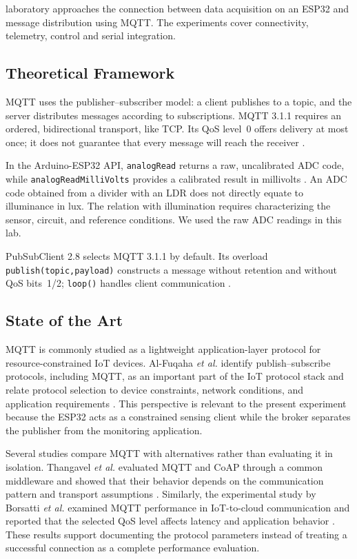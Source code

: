 laboratory approaches the connection between data acquisition on an ESP32 and message distribution using MQTT. The experiments cover connectivity, telemetry, control and serial integration.

\subsection{Theoretical Framework}
MQTT uses the publisher--subscriber model: a client publishes to a topic, and the server distributes messages according to subscriptions.
MQTT 3.1.1 requires an ordered, bidirectional transport, like TCP. Its QoS level~0 offers delivery at most once; it does not guarantee that every message will reach the receiver \cite{mqtt311}.

In the Arduino-ESP32 API, \texttt{analogRead} returns a raw, uncalibrated ADC code, while \texttt{analogReadMilliVolts} provides a calibrated result in millivolts \cite{esp32adc}. An ADC code obtained from a divider with an LDR does not directly equate to illuminance in lux. The relation
with illumination requires characterizing the sensor, circuit, and reference conditions. We used the raw ADC readings in this lab.

PubSubClient 2.8 selects MQTT 3.1.1 by default. Its overload \texttt{publish(topic,payload)} constructs a message without retention and without QoS bits~1/2; \texttt{loop()} handles client communication \cite{pubsub28}.

\subsection{State of the Art}
MQTT is commonly studied as a lightweight application-layer protocol for
resource-constrained IoT devices. Al-Fuqaha \emph{et al.} identify
publish--subscribe protocols, including MQTT, as an important part of the
IoT protocol stack and relate protocol selection to device constraints,
network conditions, and application requirements \cite{alfuqaha2015}.
This perspective is relevant to the present experiment because the ESP32
acts as a constrained sensing client while the broker separates the
publisher from the monitoring application.

Several studies compare MQTT with alternatives rather than evaluating it
in isolation. Thangavel \emph{et al.} evaluated MQTT and CoAP through a
common middleware and showed that their behavior depends on the
communication pattern and transport assumptions \cite{thangavel2014}.
Similarly, the experimental study by Borsatti \emph{et al.}
examined MQTT performance in IoT-to-cloud communication and reported that
the selected QoS level affects latency and application behavior
\cite{borsatti2020}. These results support documenting the protocol
parameters instead of treating a successful connection as a complete
performance evaluation.

